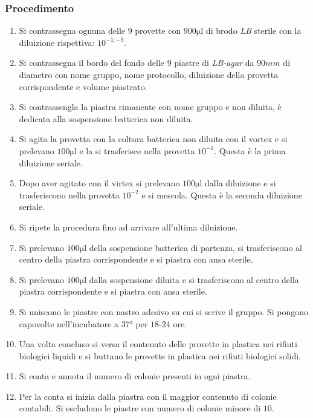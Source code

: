 		\subsubsection{Procedimento}
		\begin{enumerate}
			\item Si contrassegna ognuna delle $9$ provette con $900\si{\micro\litre}$ di brodo \emph{LB} sterile con la diluizione rispettiva: $10^{-1;-9}$.
			\item Si contrassegna il bordo del fondo delle $9$ piastre di \emph{LB-agar} da $90\si{mm}$ di diametro con nome gruppo, nome protocollo, diluizione della provetta corrispondente e volume piastrato.
			\item Si contrassengla la piastra rimanente con nome gruppo e non diluita, \`e dedicata alla sospensione batterica non diluita.
			\item Si agita la provetta con la coltura batterica non diluita con il vortex e si prelevano $100\si{\micro\litre}$ e la si trasferisce nella provetta $10^{-1}$.
				Questa \`e la prima diluizione seriale.
			\item Dopo aver agitato con il virtex si prelevano $100\si{\micro\litre}$ dalla diluizione e si trasferiscono nella provetta $10^{-2}$ e si mescola.
				Questa \`e la seconda diluizione seriale.
			\item Si ripete la procedura fino ad arrivare all'ultima diluizione.
			\item Si prelevano $100\si{\micro\litre}$ della sospensione batterica di partenza, si trasferiscono al centro della piastra corrispondente e si piastra con ansa sterile.
			\item Si prelevano $100\si{\micro\litre}$ dalla sospensione diluita e si trasferiscono al centro della piastra corrispondente e si piastra con ansa sterile.
			\item Si uniscono le piastre con nastro adesivo su cui si scrive il gruppo. 
				Si pongono capovolte nell'incubatore a $37\si{\degree}$ per $18$-$24$ ore.
			\item Una volta concluso si versa il contenuto delle provette in plastica nei rifiuti biologici liquidi e si buttano le provette in plastica nei rifiuti biologici solidi.
			\item Si conta e annota il numero di colonie presenti in ogni piastra.
			\item Per la conta si inizia dalla piastra con il maggior contenuto di colonie contabili.
				Si escludono le piastre con numero di colonie minore di $10$.
		\end{enumerate}

